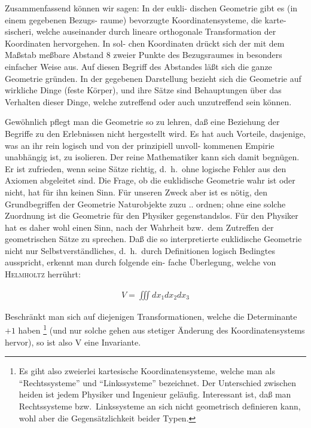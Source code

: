 Zusammenfassend können wir sagen: In der eukli-
dischen Geometrie gibt es (in einem gegebenen Bezugs-
raume) bevorzugte Koordinatensysteme, die karte-
sischeri, welche auseinander durch lineare orthogonale
Transformation der Koordinaten hervorgehen. In sol-
chen Koordinaten drückt sich der mit dem Maßstab
meßbare Abstand 8 zweier Punkte des Bezugsraumes in
besonders einfacher Weise aus. Auf diesen Begriff des
Abstandes läßt sich die ganze Geometrie gründen. In
der gegebenen Darstellung bezieht sich die Geometrie
auf wirkliche Dinge (feste Körper), und ihre Sätze sind
Behauptungen über das Verhalten dieser Dinge, welche
zutreffend oder auch unzutreffend sein können.

Gewöhnlich pflegt man die Geometrie so zu lehren,
daß eine Beziehung der Begriffe zu den Erlebnissen
nicht hergestellt wird. Es hat auch Vorteile, dasjenige,
was an ihr rein logisch und von der prinzipiell unvoll-
kommenen Empirie unabhängig ist, zu isolieren. Der
reine Mathematiker kann sich damit begnügen. Er ist
zufrieden, wenn seine Sätze richtig, d.\ h.\ ohne logische
Fehler aus den Axiomen abgeleitet sind. Die Frage, ob
die euklidische Geometrie wahr ist oder nicht, hat für
ihn keinen Sinn. Für unseren Zweck aber ist es nötig,
den Grundbegriffen der Geometrie Naturobjekte zuzu ..
ordnen; ohne eine solche Zuordnung ist die Geometrie
für den Physiker gegenstandslos. Für den Physiker
hat es daher wohl einen Sinn, nach der Wahrheit bzw.\
dem Zutreffen der geometrischen Sätze zu sprechen.
Daß die so interpretierte euklidische Geometrie nicht
nur Selbstverständliches, d.\ h.\ durch Definitionen logisch
Bedingtes ausspricht, erkennt man durch folgende ein-
fache Überlegung, welche von \textsc{Helmholtz} herrührt:

\begin{align}
    V = \iiint d x_1 d x_2 d x_3
\end{align}

Beschränkt man sich auf diejenigen Transformationen, welche die Determinante 
$+1$ haben \footnote{Es giht also zweierlei kartesische Koordinatensysteme,
welche man als \enquote{Rechtssysteme} und \enquote{Linkssysteme} bezeichnet. 
Der Unterschied zwischen heiden ist jedem Physiker und Ingenieur geläufig. 
Interessant ist, daß man Rechtssysteme bzw.\ Linkssysteme an sich nicht 
geometrisch definieren kann, wohl aber die Gegensätzlichkeit beider Typen.} (und 
nur solche gehen aus stetiger Änderung des Koordinatensystems hervor), so ist 
also V eine Invariante.

